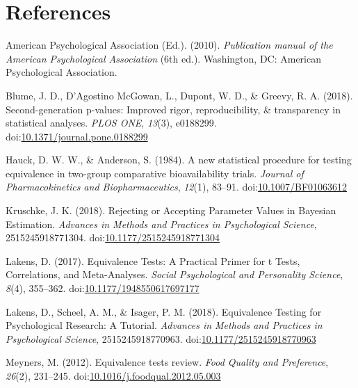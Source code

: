 \documentclass[,man,floatsintext]{apa6}
\begin{document}
\newpage

\section{References}\label{references}

\setlength{\parindent}{-0.5in} \setlength{\leftskip}{0.5in}

\hypertarget{refs}{}
\hypertarget{ref-american_psychological_association_publication_2010}{}
American Psychological Association (Ed.). (2010). \emph{Publication
manual of the American Psychological Association} (6th ed.). Washington,
DC: American Psychological Association.

\hypertarget{ref-blume_second-generation_2018}{}
Blume, J. D., D'Agostino McGowan, L., Dupont, W. D., \& Greevy, R. A.
(2018). Second-generation p-values: Improved rigor, reproducibility, \&
transparency in statistical analyses. \emph{PLOS ONE}, \emph{13}(3),
e0188299.
doi:\href{https://doi.org/10.1371/journal.pone.0188299}{10.1371/journal.pone.0188299}

\hypertarget{ref-hauck_new_1984}{}
Hauck, D. W. W., \& Anderson, S. (1984). A new statistical procedure for
testing equivalence in two-group comparative bioavailability trials.
\emph{Journal of Pharmacokinetics and Biopharmaceutics}, \emph{12}(1),
83--91.
doi:\href{https://doi.org/10.1007/BF01063612}{10.1007/BF01063612}

\hypertarget{ref-kruschke_rejecting_2018}{}
Kruschke, J. K. (2018). Rejecting or Accepting Parameter Values in
Bayesian Estimation. \emph{Advances in Methods and Practices in
Psychological Science}, 2515245918771304.
doi:\href{https://doi.org/10.1177/2515245918771304}{10.1177/2515245918771304}

\hypertarget{ref-lakens_equivalence_2017}{}
Lakens, D. (2017). Equivalence Tests: A Practical Primer for t Tests,
Correlations, and Meta-Analyses. \emph{Social Psychological and
Personality Science}, \emph{8}(4), 355--362.
doi:\href{https://doi.org/10.1177/1948550617697177}{10.1177/1948550617697177}

\hypertarget{ref-lakens_equivalence_2018}{}
Lakens, D., Scheel, A. M., \& Isager, P. M. (2018). Equivalence Testing
for Psychological Research: A Tutorial. \emph{Advances in Methods and
Practices in Psychological Science}, 2515245918770963.
doi:\href{https://doi.org/10.1177/2515245918770963}{10.1177/2515245918770963}

\hypertarget{ref-meyners_equivalence_2012}{}
Meyners, M. (2012). Equivalence tests review. \emph{Food Quality and
Preference}, \emph{26}(2), 231--245.
doi:\href{https://doi.org/10.1016/j.foodqual.2012.05.003}{10.1016/j.foodqual.2012.05.003}
\end{document}
